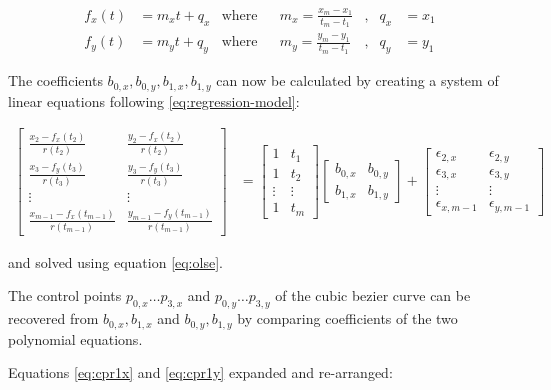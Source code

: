 \begin{align}
    f_x(t) &= m_x t + q_x & \text{where} && m_x = \frac{x_m-x_1}{t_m-t_1} &,& q_x &= x_1 \\
    f_y(t) &= m_y t + q_y & \text{where} && m_y = \frac{y_m-y_1}{t_m-t_1} &,& q_y &= y_1
\end{align}

The coefficients  $b_{0,x}, b_{0,y}, b_{1,x}, b_{1,y}$ can now be calculated by
creating  a  system  of  linear  equations following \ref{eq:regression-model}:

\begin{align}
    \begin{bmatrix}
        \frac{x_2 - f_x(t_2)}{r(t_2)} & \frac{y_2 - f_x(t_2)}{r(t_2)} \\
        \frac{x_3 - f_y(t_3)}{r(t_3)} & \frac{y_3 - f_y(t_3)}{r(t_3)} \\
        \vdots & \vdots \\
        \frac{x_{m-1} - f_x(t_{m-1})}{r(t_{m-1})} & \frac{y_{m-1} - f_y(t_{m-1})}{r(t_{m-1})}
    \end{bmatrix}
    &=
    \begin{bmatrix}
        1      & t_1     \\
        1      & t_2     \\
        \vdots & \vdots  \\
        1      & t_m
    \end{bmatrix}
    \begin{bmatrix}
        b_{0,x} & b_{0,y} \\
        b_{1,x} & b_{1,y}
    \end{bmatrix}
    +
    \begin{bmatrix}
        \epsilon_{2,x} & \epsilon_{2,y} \\
        \epsilon_{3,x} & \epsilon_{3,y} \\
        \vdots         & \vdots \\
        \epsilon_{x,{m-1}} & \epsilon_{y,{m-1}}
    \end{bmatrix}
\end{align}

and solved using equation \ref{eq:olse}.

The control points $p_{0,x} \ldots p_{3,x}$ and $p_{0,y} \ldots p_{3,y}$ of the
cubic   bezier   curve   can   be   recovered    from   $b_{0,x},b_{1,x}$   and
$b_{0,y},b_{1,y}$  by comparing coefficients of the two  polynomial  equations.

Equations \ref{eq:cpr1x} and \ref{eq:cpr1y} expanded and re-arranged:

